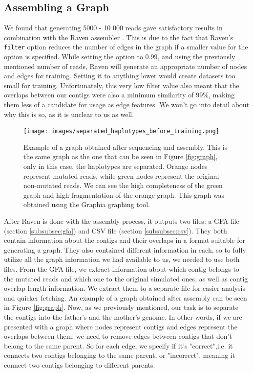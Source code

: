 \documentclass[times, utf8, diplomski, english]{fer_eng}
\begin{document}
\subsection{Assembling a Graph}
\label{subsec:assembling the graph}

We found that generating 5000 - 10 000 reads gave satisfactory results in combination with the Raven assembler \cite{Vaser}. This is due to the fact that Raven's \texttt{filter} option reduces the number of edges in the graph if a smaller value for the option is specified. While setting the option to 0.99, and using the previously mentioned number of reads, Raven will generate an appropriate number of nodes and edges for training. Setting it to anything lower would create datasets too small for training. Unfortunately, this very low filter value also meant that the overlaps between our contigs were also a minimum similarity of 99\%, making them less of a candidate for usage as edge features. We won't go into detail about why this is so, as it is unclear to us as well.

\begin{figure}[h]
	\centering
	\texttt{[image: images/separated\_haplotypes\_before\_training.png]}
	\caption[Separated graph]{Example of a graph obtained after sequencing and assembly. This is the same graph as the one that can be seen in Figure \ref{fig:graph}, only in this case, the haplotypes are separated. Orange nodes represent mutated reads, while green nodes represent the original non-mutated reads. We can see the high completeness of the green graph and high fragmentation of the orange graph. This graph was obtained using the Graphia\footnotemark{} graphing tool.}
	\label{fig:separated graph}
\end{figure}

After Raven is done with the assembly process, it outputs two files: a GFA file (section \ref{subsubsec:gfa}) and CSV file (section \ref{subsubsec:csv}). They both contain information about the contigs and their overlaps in a format suitable for generating a graph. They also contained different information in each, so to fully utilize all the graph information we had available to us, we needed to use both files. From the GFA file, we extract information about which contig belongs to the mutated reads and which one to the original simulated ones, as well as contig overlap length information. We extract them to a separate file for easier analysis and quicker fetching. An example of a graph obtained after assembly can be seen in Figure \ref{fig:graph}. Now, as we previously mentioned, our task is to separate the contigs into the father's and the mother's genome. In other words, if we are presented with a graph where nodes represent contigs and edges represent the overlaps between them, we need to remove edges between contigs that don't belong to the same parent. So for each edge, we specify if it's "correct",i.e. it connects two contigs belonging to the same parent, or "incorrect", meaning it connect two contigs belonging to different parents.
\end{document}
